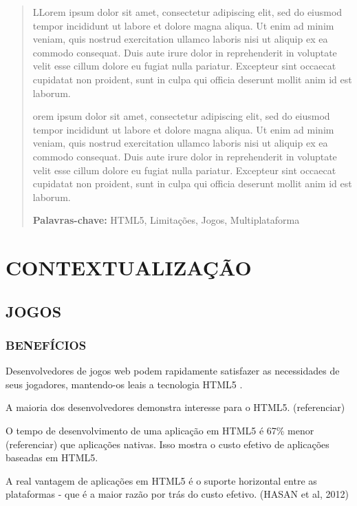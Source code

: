 \documentclass[
12pt,
a4paper,
portuges,
draft
]{report}
\begin{document}
\renewcommand{\abstractname}{\Large\bfseries ABSTRACT}
\begin{abstract}
{ LLorem ipsum dolor sit amet, consectetur adipiscing elit, sed do eiusmod tempor incididunt ut labore et dolore magna aliqua. Ut enim ad minim veniam, quis nostrud exercitation ullamco laboris nisi ut aliquip ex ea commodo consequat. Duis aute irure dolor in reprehenderit in voluptate velit esse cillum dolore eu fugiat nulla pariatur. Excepteur sint occaecat cupidatat non proident, sunt in culpa qui officia deserunt mollit anim id est laborum.

orem ipsum dolor sit amet, consectetur adipiscing elit, sed do eiusmod tempor incididunt ut labore et dolore magna aliqua. Ut enim ad minim veniam, quis nostrud exercitation ullamco laboris nisi ut aliquip ex ea commodo consequat. Duis aute irure dolor in reprehenderit in voluptate velit esse cillum dolore eu fugiat nulla pariatur. Excepteur sint occaecat cupidatat non proident, sunt in culpa qui officia deserunt mollit anim id est laborum.
}

{\bfseries Palavras-chave:} HTML5, Limitações, Jogos,
Multiplataforma
\end{abstract}


{\listoffigures}
\clearpage
{\tableofcontents}
\chapter{CONTEXTUALIZAÇÃO}%

\section{JOGOS}

\subsection{BENEFÍCIOS}
Desenvolvedores de jogos web podem rapidamente satisfazer as
necessidades de seus jogadores, mantendo-os leais a tecnologia HTML5
\autocite{developingEffect}.

A maioria dos desenvolvedores demonstra interesse para o HTML5. (referenciar)

O tempo de desenvolvimento de uma aplicação em HTML5 é 67\% menor (referenciar)
que aplicações nativas. Isso mostra o custo efetivo de aplicações baseadas em HTML5. 

A real vantagem de aplicações em HTML5 é o suporte
horizontal entre as plataformas - que é a maior razão por trás do
custo efetivo. (HASAN et al, 2012)
\end{document}

